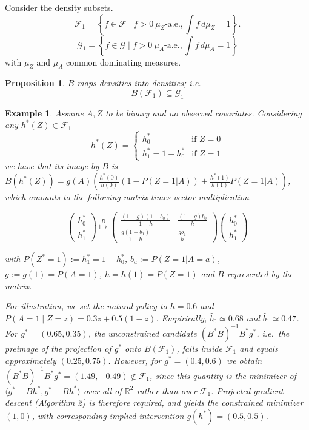 \documentclass[12pt]{article}
\theoremstyle{thmstyleone}%
\newtheorem{propo}[theo]{Proposition}%
\theoremstyle{thmstyletwo}%
\newtheorem{example}{Example}%
\theoremstyle{thmstylethree}%
\begin{document}
Consider the density subsets.
	\[
\mathcal{F}_1 = \left\{ f \in \mathcal{F} \mid f > 0 \ \mu_Z\text{-a.e.}, \int f \, d\mu_Z = 1 \right\}.
\]
\[
\mathcal{G}_1 = \left\{ f \in \mathcal{G} \mid f > 0 \ \mu_A\text{-a.e.}, \int f \, d\mu_A = 1 \right\}
\]
with $\mu_Z$ and $\mu_A$ common dominating measures.

\begin{propo}\label{inc-app} $B$ maps densities into densities; i.e.
	$$B(\mathcal{F}_1) \subseteq \mathcal{G}_1$$
	\end{propo}

\begin{example}	Assume $A,Z$ to be binary and no observed covariates. Considering any $h^*(Z) \in \mathcal{F}_1$ 
	$$ h^*(Z) =\begin{cases}
		h^*_0 & \text{if } Z = 0  \\
		h^*_1  = 1- h^* _0 & \text{if } Z=1
	\end{cases} $$ we have that its image by $B$ is	$B(h^*(Z)) = g(A)\left(\frac{h^*(0)}{h(0)}(1-P(Z=1|A)) + \frac{h^*(1)}{h(1)}P(Z=1|A) \right) $, which amounts to the following matrix times vector multiplication
	
	
	\[
	\begin{pmatrix}
		h_0^* \\
		h_1^*
	\end{pmatrix} \overset{B}{\longmapsto}
	\begin{pmatrix}
		\displaystyle\frac{(1 - g)(1 - b_0)}{1 - h} & \displaystyle\frac{(1 - g) b_0}{h} \\
		\displaystyle\frac{g(1 - b_1)}{1 - h} & \displaystyle\frac{g b_1}{h}
	\end{pmatrix}
	\begin{pmatrix}
		h_0^* \\
		h_1^*
	\end{pmatrix}
	\]
	
	with $P(Z^*=1):=h^*_1= 1-h^*_0$, $b_a:=P(Z=1|A=a)$, $g:=g(1)=P(A=1)$, $h=h(1)=P(Z=1)$ and $B$ represented by the matrix. 
	
	
	 {For illustration, we set the natural policy to $h=0.6$ and $P(A=1\mid Z=z) = 0.3z + 0.5(1-z)$. Empirically, $\hat{b}_0 \simeq 0.68$ and $\hat{b}_1 \simeq 0.47$. For $g^*=(0.65,0.35)$, the unconstrained candidate $(B^*B)^{-1}B^*g^*$, i.e.\ the preimage of the projection of $g^*$ onto $B(\mathcal{F}_1)$, falls inside $\mathcal{F}_1$ and equals approximately $(0.25,0.75)$. However, for $g^*=(0.4,0.6)$ we obtain $(B^*B)^{-1}B^*g^* = (1.49,-0.49) \notin \mathcal{F}_1$, since this quantity is the minimizer of $\langle g^*-Bh^*, g^*-Bh^*\rangle$ over all of $\mathbb{R}^2$ rather than over $\mathcal{F}_1$. Projected gradient descent (Algorithm 2) is therefore required, and yields the constrained minimizer $(1,0)$, with corresponding implied intervention $g(h^*) = (0.5,0.5)$.}
	
\end{example}
\end{document}
